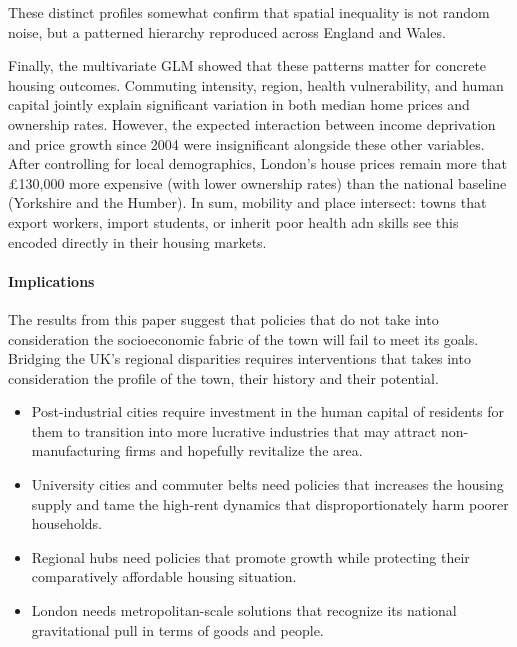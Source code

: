 \documentclass[12pt]{article}
\begin{document}
These distinct profiles somewhat confirm that spatial inequality is not random noise, but a patterned hierarchy reproduced across England and Wales.

Finally, the multivariate GLM showed that these patterns matter for concrete housing outcomes. Commuting intensity, region, health vulnerability, and human capital jointly explain significant variation in both median home prices and ownership rates. However, the expected interaction between income deprivation and price growth since 2004 were insignificant alongside these other variables. After controlling for local demographics, London's house prices remain more that \pounds 130,000 more expensive (with lower ownership rates) than the national baseline (Yorkshire and the Humber). In sum, mobility and place intersect: towns that export workers, import students, or inherit poor health adn skills see this encoded directly in their housing markets.

\paragraph{Implications}
The results from this paper suggest that policies that do not take into consideration the socioeconomic fabric of the town will fail to meet its goals. Bridging the UK's regional disparities requires interventions that takes into consideration the profile of the town, their history and their potential. 
\begin{itemize}
    \item Post-industrial cities require investment in the human capital of residents for them to transition into more lucrative industries that may attract non-manufacturing firms and hopefully revitalize the area.
    \item University cities and commuter belts need policies that increases the housing supply and tame the high-rent dynamics that disproportionately harm poorer households.
    \item Regional hubs need policies that promote growth while protecting their comparatively affordable housing situation.
    \item London needs metropolitan-scale solutions that recognize its national gravitational pull in terms of goods and people. 
\end{itemize}
\end{document}
